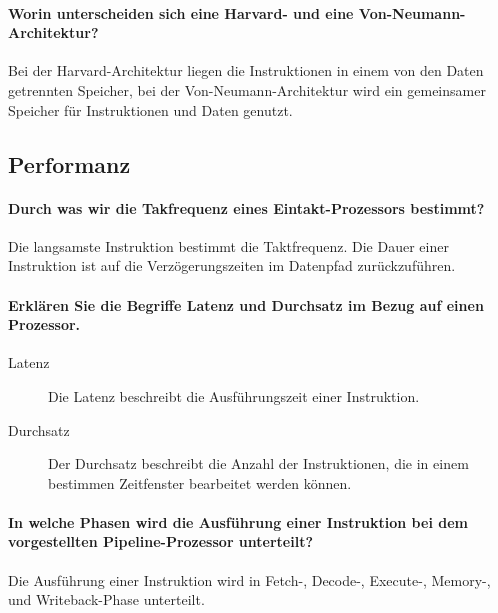 \documentclass[a4paper, 11pt, accentcolor = tud3b]{tudreport}
\begin{document}
            \paragraph{Worin unterscheiden sich eine Harvard- und eine Von-Neumann-Architektur?}
                Bei der Harvard-Architektur liegen die Instruktionen in einem von den Daten getrennten Speicher, bei der Von-Neumann-Architektur wird ein gemeinsamer Speicher für Instruktionen und Daten genutzt.

            \subsection{Performanz}
                \paragraph{Durch was wir die Takfrequenz eines Eintakt-Prozessors bestimmt?}
                    Die langsamste Instruktion bestimmt die Taktfrequenz. Die Dauer einer Instruktion ist auf die Verzögerungszeiten im Datenpfad zurückzuführen.

                \paragraph{Erklären Sie die Begriffe Latenz und Durchsatz im Bezug auf einen Prozessor.}
                    \begin{description}
                        \item[Latenz] Die Latenz beschreibt die Ausführungszeit einer Instruktion.
                        \item[Durchsatz] Der Durchsatz beschreibt die Anzahl der Instruktionen, die in einem bestimmen Zeitfenster bearbeitet werden können.
                    \end{description}

                \paragraph{In welche Phasen wird die Ausführung einer Instruktion bei dem vorgestellten Pipeline-Prozessor unterteilt?}
                    Die Ausführung einer Instruktion wird in Fetch-, Decode-, Execute-, Memory-, und Writeback-Phase unterteilt.
\end{document}
